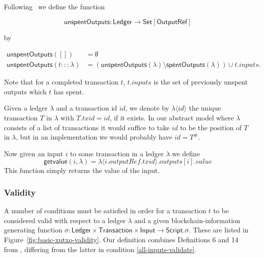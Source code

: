 \documentclass[a4paper]{article}
\theoremstyle{definition}  %
\newcommand{\mi}[1]{\ensuremath{\mathit{#1}}}
\newcommand{\txid}{\mi{txid}}
\newcommand{\inputs}{\mi{inputs}}
\newcommand{\outputs}{\mi{outputs}}
\newcommand{\outputref}{\mi{outputRef}}
\newcommand{\id}{\mi{id}}
\newcommand{\getvalue}{\msf{getvalue}}
\newcommand{\msf}[1]{\ensuremath{\mathsf{#1}}}
\newcommand{\spent}{\msf{spentOutputs}}
\newcommand{\unspent}{\msf{unspentOutputs}}
\begin{document}
\noindent Following~\cite{Zahnentferner18-UTxO} we define the function

\[
  \unspent : \mathsf{Ledger} \rightarrow \mathsf{Set[OutputRef]}
\]

\noindent by

\begin{align*}
   \unspent([]) &=\emptyset \\
   \unspent(t:::\lambda) &= (\unspent(\lambda) \setminus \spent(\lambda)) \cup t.\inputs.
\end{align*}

\noindent Note that for a completed transaction $t$, $t.\inputs$ is
the set of previously unspent outputs which $t$ has spent.

\vspace{7pt}
\noindent Given a ledger $\lambda$ and a transaction id $\id$, we
denote by $\lambda\langle\id\rangle$ the unique transaction $T$ in
$\lambda$ with $T.\txid = \id$, if it exists. In our abstract model
where $\lambda$ consists of a list of transactions it would suffice to
take $id$ to be the position of $T$ in $\lambda$, but in an
implementation we would probably have $id = T^{\#}$.

Now given an input $i$ to some transaction in a ledger $\lambda$
we define 
$$
\getvalue(i,\lambda) = \lambda\langle i.\outputref.\txid \rangle.\outputs[i].value
$$
This function simply returns the value of the input.

\subsubsection{Validity}
A number of conditions must be satisfied in order for a transaction
$t$ to be considered valid with respect to a ledger $\lambda$ and a
given blockchain-information generating function $\sigma :
\mathsf{Ledger} \times \mathsf{Transaction} \times \mathsf{Input}
\rightarrow \mathsf{Script}$.$\sigma$.  These are listed in
Figure~\ref{fig:basic-xutxo-validity}.  Our definition combines
Definitions 6 and 14 from \cite{Zahnentferner18-UTxO}, differing from
the latter in condition \ref{all-inputs-validate}.
\end{document}
